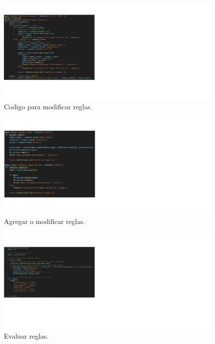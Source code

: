 \begin{figure}[H]
\begin{center}
\includegraphics[scale = 0.8]{./images/modificar reglas.png}
 \caption{Codigo para modificar reglas.}
\label{fig:huella}
\end{center}
\end{figure}

\begin{figure}[H]
    \begin{center}
     \includegraphics[scale = 0.8]{./images/agregar eliminar.png}
     \caption{Agregar o modificar reglas.}
     \label{fig:huella}
    \end{center}
    \end{figure}

            \begin{figure}[H]
                \begin{center}
                \includegraphics[scale = 0.8]{./images/evaluar reglas.png}
                \caption{Evaluar reglas.}
                \label{fig:huella}
                \end{center}
                \end{figure}
    
